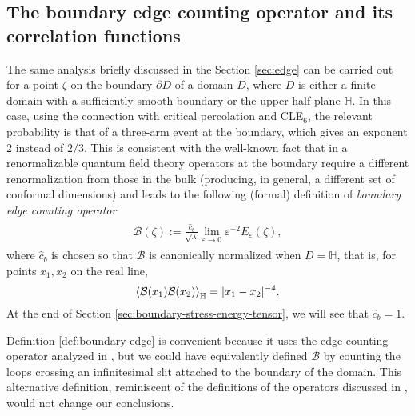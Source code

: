 \documentclass[a4paper,11pt]{article}
\begin{document}
\subsection{The boundary edge counting operator and its correlation functions}

The same analysis briefly discussed in the Section \ref{sec:edge} can be carried out for a point $\zeta$ on the boundary $\partial D$ of a domain $D$, where $D$ is either a finite domain with a sufficiently smooth boundary or the upper half plane $\mathbb{H}$.
In this case, using the connection with critical percolation and CLE$_6$, the relevant probability is that of a three-arm event at the boundary, which gives an exponent $2$ instead of $2/3$. This is consistent with the well-known fact that in a renormalizable quantum field theory operators at the boundary require a different renormalization from those in the bulk \cite{CARDY2006333} (producing, in general, a different set of conformal dimensions) and leads to the following (formal) definition of \emph{boundary edge counting operator}
\begin{align}
\begin{split} \label{def:boundary-edge}
    {\mathcal B}(\zeta) := \frac{\hat{c}_b}{\sqrt\lambda} \lim_{\varepsilon \to 0} \varepsilon^{-2} E_{\varepsilon}(\zeta),
\end{split}
\end{align}
where $\hat{c}_b$ is chosen so that ${\mathcal B}$ is canonically normalized when $D=\mathbb{H}$, that is, for points $x_1,x_2$ on the real line,
\begin{equation} \label{eq:canonical_boundary}
\Braket{{\mathcal B}(x_1){\mathcal B}(x_2)}_{\mathbb H} = |x_1-x_2|^{-4}.
\end{equation}
At the end of Section \ref{sec:boundary-stress-energy-tensor}, we will see that $\hat{c}_b=1$.

Definition \eqref{def:boundary-edge} is convenient because it uses the edge counting operator analyzed in \cite{camia2021scalar}, but we could have equivalently defined $\mathcal{B}$ by counting the loops crossing an infinitesimal slit attached to the boundary of the domain. This alternative definition, reminiscent of the definitions of the operators discussed in \cite{FRIEDRICH2002947,Doyon_2006}, would not change our conclusions.
\end{document}
